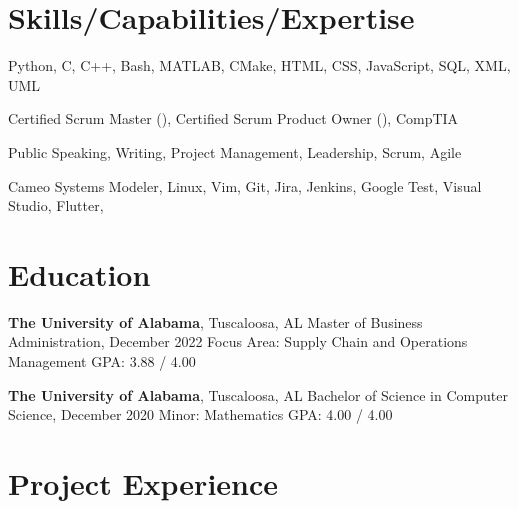 \documentclass[hidelinks, 11pt]{article}
\begin{document}
\makecvtitle
\vspace{0.5mm}

\section{Skills/Capabilities/Expertise}

\begin{description}[widest=Programming Langauges:]
	\item[Programming Languages\normalfont:] Python, C, C++, Bash, MATLAB, CMake, HTML, CSS, JavaScript, SQL, XML, UML
	\item[Certifications\normalfont:] Certified Scrum Master (), Certified Scrum Product Owner (), CompTIA 
	\item[Soft Skills\normalfont:] Public Speaking, Writing, Project Management, Leadership, Scrum, Agile
	\item[Tools\normalfont:] Cameo Systems Modeler, Linux, Vim, Git, Jira, Jenkins, Google Test, Visual Studio, Flutter, 
\end{description}

\section{Education}
\begin{multicols}{2}
	\begin{minipage}{0.5\textwidth}
		\textbf{The University of Alabama}, Tuscaloosa, AL \newline
		Master of Business Administration, December 2022 \newline
		Focus Area: Supply Chain and Operations Management \newline
		GPA: 3.88 / 4.00
	\end{minipage}
	\begin{minipage}{0.5\textwidth}
		\textbf{The University of Alabama}, Tuscaloosa, AL \newline
		Bachelor of Science in Computer Science, December 2020 \newline
		Minor: Mathematics \newline
		GPA: 4.00 / 4.00
	\end{minipage}
\end{multicols}

\section{Project Experience}
\end{document}
